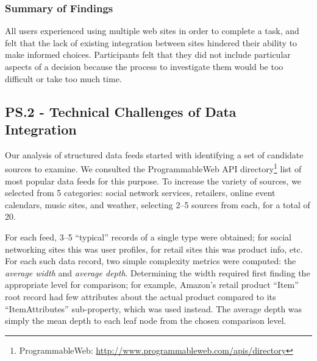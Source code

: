 \documentclass{sigchi}
\begin{document}
\subsubsection{Summary of Findings}

All users experienced using multiple web sites in order to complete a task, and felt that the lack of existing integration between sites hindered their ability to make informed choices. Participants felt that they did not include particular aspects of a decision because the process to investigate them would be too difficult or take too much time. 


\subsection{PS.2 - Technical Challenges of Data Integration}
Our analysis of structured data feeds started with identifying a set of candidate sources to examine.  We consulted the ProgrammableWeb API directory\footnote{ProgrammableWeb: \url{http://www.programmableweb.com/apis/directory}} list of most popular data feeds for this purpose.  To increase the variety of sources, we selected from 5 categories: social network services, retailers, online event calendars, music sites, and weather, selecting 2--5 sources from each, for a total of 20.  

For each feed, 3--5 ``typical'' records of a single type were obtained; for social networking sites this was user profiles, for retail sites this was product info, etc.
For each such data record, two simple complexity metrics were computed: the \emph{average width} and \emph{average depth}.  Determining the width required first finding the appropriate level for comparison; for example, Amazon's retail product ``Item'' root record had few attributes about the actual product compared to its ``ItemAttributes'' sub-property, which was used instead. The average depth was simply the mean depth to each leaf node from the chosen comparison level.
\end{document}
